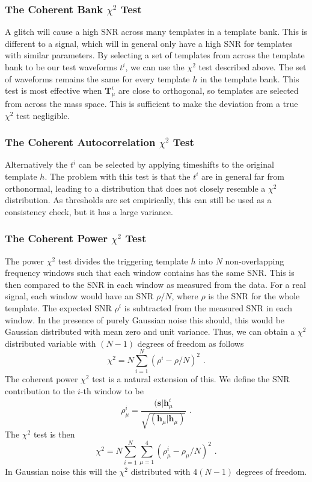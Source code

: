 \documentclass[11pt]{cuthesis}
\newcommand{\fs}{\text{ .}}
\begin{document}
\subsubsection{The Coherent Bank $\chi^2$ Test}
A glitch will cause a high SNR across many templates in a template bank. This is different to a signal, which will in general only have a high SNR for templates with similar parameters. By selecting a set of templates from across the template bank to be our test waveforms $t^i$, we can use the $\chi^2$ test described above. The set of waveforms remains the same for every template $h$ in the template bank. This test is most effective when $\textbf{T}^i_\mu$ are close to orthogonal, so templates are selected from across the mass space. This is sufficient to make the deviation from a true $\chi^2$ test negligible. 

\subsubsection{The Coherent Autocorrelation $\chi^2$ Test}
Alternatively the $t^i$ can be selected by applying timeshifts to the original template $h$. The problem with this test is that the $t^i$ are in general far from orthonormal, leading to a distribution that does not closely resemble a $\chi^2$ distribution. As thresholds are set empirically, this can still be used as a consistency check, but it has a large variance.


\subsubsection{The Coherent Power $\chi^2$ Test}
The power $\chi^2$ test divides the triggering template $h$ into $N$ non-overlapping frequency windows such that each window contains has the same SNR. This is then compared to the SNR in each window as measured from the data. For a real signal, each window would have an SNR $\rho/N$, where $\rho$ is the SNR for the whole template. The expected SNR $\rho^i$ is subtracted from the measured SNR in each window. In the presence of purely Gaussian noise this should, this would be Gaussian distributed with mean zero and unit variance. Thus, we can obtain a $\chi^2$ distributed variable with $(N-1)$ degrees of freedom as follows
\begin{equation}
\chi^2 = N \sum_{i=1}^N (\rho^i - \rho/N)^2 \fs
\end{equation}
The coherent power $\chi^2$ test is a natural extension of this. We define the SNR contribution to the $i$-th window to be
\begin{equation}
\rho^i_\mu = \frac{(\textbf{s}|\textbf{h}^i_\mu}{\sqrt{(\textbf{h}_\mu|\textbf{h}_\mu)}} \fs
\end{equation}
The $\chi^2$ test is then
\begin{equation}
\chi^2 = N \sum_{i=1}^N \sum_{\mu=1}^4 (\rho^i_\mu - \rho_\mu/N)^2 \fs
\end{equation}
In Gaussian noise this will the $\chi^2$ distributed with $4(N-1)$ degrees of freedom. 
\end{document}
